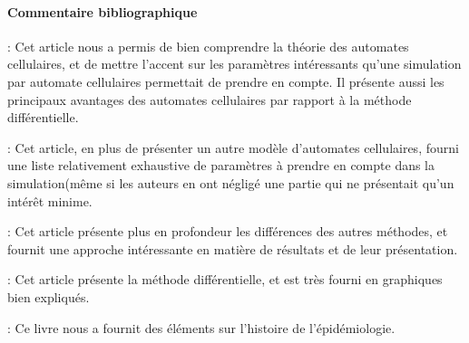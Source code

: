 \documentclass{article}
\begin{document}
%



\newpage

\paragraph{Commentaire bibliographique\\}
\noindent
\cite{ref} : Cet article nous a permis de bien comprendre la théorie des automates cellulaires, et de mettre l'accent sur les paramètres intéressants qu'une simulation par automate cellulaires permettait de prendre en compte. Il présente aussi les principaux avantages des automates cellulaires par rapport à la méthode différentielle.

\cite{ref2} : Cet article, en plus de présenter un autre modèle d'automates cellulaires, fourni une liste relativement exhaustive de paramètres à prendre en compte dans la simulation(même si les auteurs en ont négligé une partie qui ne présentait qu'un  intérêt minime.

\cite{ref3} : Cet article présente plus en profondeur les différences des autres méthodes,  et fournit une approche intéressante en matière de résultats et de leur présentation.

\cite{ref4} : Cet article présente la méthode différentielle, et est très fourni en graphiques bien expliqués.

\cite{ref5} : Ce livre nous a fournit des éléments sur l'histoire de l'épidémiologie.

\newpage




\end{document}
